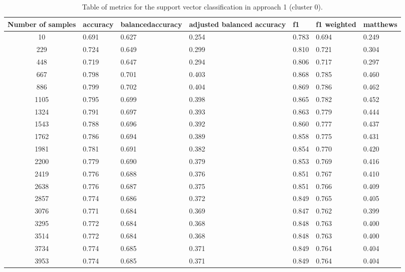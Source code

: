 \documentclass[sigplan,screen]{acmart}
\begin{document}
\begin{table}[h]
  \caption{Table of metrics for the support vector classification in approach 1 (cluster 0).}
  \label{tab:A1_classification_svc_cluster0}
  \begin{tabular}{cllllll}
    \toprule
    Number of samples & accuracy & balancedaccuracy & adjusted balanced accuracy & f1 & f1 weighted & matthews\\
    \midrule
          10 & 0.691 & 0.627 & 0.254 & 0.783 & 0.694 & 0.249\\
      229 & 0.724 & 0.649 & 0.299 & 0.810 & 0.721 & 0.304\\
      448 & 0.719 & 0.647 & 0.294 & 0.806 & 0.717 & 0.297\\
      667 & 0.798 & 0.701 & 0.403 & 0.868 & 0.785 & 0.460\\
      886 & 0.799 & 0.702 & 0.404 & 0.869 & 0.786 & 0.462\\
     1105 & 0.795 & 0.699 & 0.398 & 0.865 & 0.782 & 0.452\\
     1324 & 0.791 & 0.697 & 0.393 & 0.863 & 0.779 & 0.444\\
     1543 & 0.788 & 0.696 & 0.392 & 0.860 & 0.777 & 0.437\\
     1762 & 0.786 & 0.694 & 0.389 & 0.858 & 0.775 & 0.431\\
     1981 & 0.781 & 0.691 & 0.382 & 0.854 & 0.770 & 0.420\\
     2200 & 0.779 & 0.690 & 0.379 & 0.853 & 0.769 & 0.416\\
     2419 & 0.776 & 0.688 & 0.376 & 0.851 & 0.767 & 0.410\\
     2638 & 0.776 & 0.687 & 0.375 & 0.851 & 0.766 & 0.409\\
     2857 & 0.774 & 0.686 & 0.372 & 0.849 & 0.765 & 0.405\\
     3076 & 0.771 & 0.684 & 0.369 & 0.847 & 0.762 & 0.399\\
     3295 & 0.772 & 0.684 & 0.368 & 0.848 & 0.763 & 0.400\\
     3514 & 0.772 & 0.684 & 0.368 & 0.848 & 0.763 & 0.400\\
     3734 & 0.774 & 0.685 & 0.371 & 0.849 & 0.764 & 0.404\\
     3953 & 0.774 & 0.685 & 0.371 & 0.849 & 0.764 & 0.404\\
    \bottomrule
    \end{tabular}
\end{table}
\end{document}
